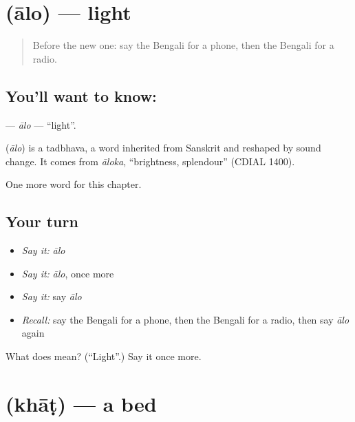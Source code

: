 \section[\texorpdfstring{\bn{আলো} (ālo)}{আলো (ālo)}]{ (ālo) — light}

\label{lesson:BN-C132-alo}



\begin{quote}
Before the new one: say the Bengali for a phone, then the Bengali for a radio.
\end{quote}

\subsection*{You'll want to know: }
\textbf{} — \emph{ālo} — \textquotedblleft{}light\textquotedblright{}.

\begin{cousinweb}
\textbf{} (\emph{ālo}) is a tadbhava, a word inherited from Sanskrit and reshaped by sound change. It comes from \emph{āloka}, \textquotedblleft{}brightness, splendour\textquotedblright{} (CDIAL 1400).
\end{cousinweb}

\begin{grammarlens}[title={What you've built}]
One more word for this chapter.
\end{grammarlens}

\subsection*{Your turn}
\begin{itemize}
\raggedright
  \item \emph{Say it:} \emph{ālo}
  \item \emph{Say it:} \emph{ālo}, once more
  \item \emph{Say it:} say \emph{ālo}
  \item \emph{Recall:} say the Bengali for a phone, then the Bengali for a radio, then say \emph{ālo} again
\end{itemize}

\begin{tcolorbox}[breakable,colback=teal!4,colframe=teal!35!black,title={Before you move on}]
What does  mean? (\textquotedblleft{}Light\textquotedblright{}.) Say it once more.
\end{tcolorbox}
\section[\texorpdfstring{\bn{খাট} (khāṭ)}{খাট (khāṭ)}]{ (khāṭ) — a bed}

